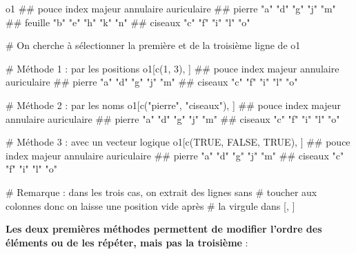 \documentclass[12pt,twosided, notitlepage]{book}
\newenvironment{Shaded}{}{}
\newcommand{\CommentTok}[1]{\textcolor[rgb]{0.00,0.50,0.00}{#1}}
\newcommand{\DecValTok}[1]{#1}
\newcommand{\KeywordTok}[1]{\textcolor[rgb]{0.00,0.00,1.00}{#1}}
\newcommand{\NormalTok}[1]{#1}
\newcommand{\OtherTok}[1]{\textcolor[rgb]{1.00,0.25,0.00}{#1}}
\newcommand{\StringTok}[1]{\textcolor[rgb]{0.00,0.50,0.50}{#1}}
\renewenvironment{Shaded}{\begin{snugshade}}{\end{snugshade}}
\begin{document}
\begin{Shaded}
\begin{Highlighting}[]
\NormalTok{o1}
\NormalTok{  ##         pouce index majeur annulaire auriculaire}
\NormalTok{  ## pierre  "a"   "d"   "g"    "j"       "m"        }
\NormalTok{  ## feuille "b"   "e"   "h"    "k"       "n"        }
\NormalTok{  ## ciseaux "c"   "f"   "i"    "l"       "o"}

\CommentTok{# On cherche à sélectionner la première et de la troisième ligne de o1}

\CommentTok{# Méthode 1 : par les positions}
\NormalTok{o1[}\KeywordTok{c}\NormalTok{(}\DecValTok{1}\NormalTok{, }\DecValTok{3}\NormalTok{), ]}
\NormalTok{  ##         pouce index majeur annulaire auriculaire}
\NormalTok{  ## pierre  "a"   "d"   "g"    "j"       "m"        }
\NormalTok{  ## ciseaux "c"   "f"   "i"    "l"       "o"}

\CommentTok{# Méthode 2 : par les noms}
\NormalTok{o1[}\KeywordTok{c}\NormalTok{(}\StringTok{"pierre"}\NormalTok{, }\StringTok{"ciseaux"}\NormalTok{), ]}
\NormalTok{  ##         pouce index majeur annulaire auriculaire}
\NormalTok{  ## pierre  "a"   "d"   "g"    "j"       "m"        }
\NormalTok{  ## ciseaux "c"   "f"   "i"    "l"       "o"}

\CommentTok{# Méthode 3 : avec un vecteur logique}
\NormalTok{o1[}\KeywordTok{c}\NormalTok{(}\OtherTok{TRUE}\NormalTok{, }\OtherTok{FALSE}\NormalTok{, }\OtherTok{TRUE}\NormalTok{), ]}
\NormalTok{  ##         pouce index majeur annulaire auriculaire}
\NormalTok{  ## pierre  "a"   "d"   "g"    "j"       "m"        }
\NormalTok{  ## ciseaux "c"   "f"   "i"    "l"       "o"}

\CommentTok{# Remarque : dans les trois cas, on extrait des lignes sans}
\CommentTok{# toucher aux colonnes donc on laisse une position vide après}
\CommentTok{# la virgule dans [, ]}
\end{Highlighting}
\end{Shaded}

\textbf{Les deux premières méthodes permettent de modifier l'ordre des
éléments ou de les répéter, mais pas la troisième} :
\end{document}
